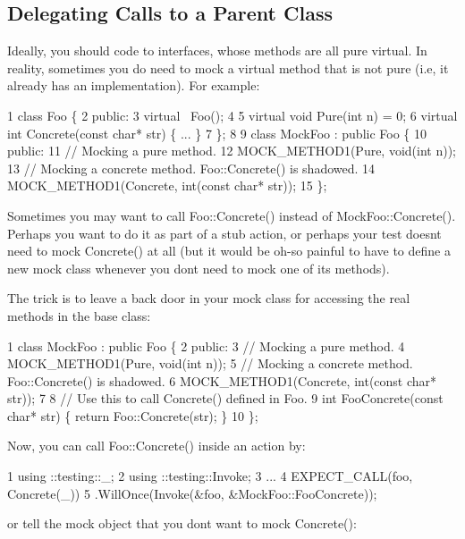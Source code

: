 \subsection*{Delegating Calls to a Parent Class}

Ideally, you should code to interfaces, whose methods are all pure virtual. In reality, sometimes you do need to mock a virtual method that is not pure (i.\+e, it already has an implementation). For example\+:


\begin{DoxyCode}
1 class Foo \{
2  public:
3   virtual ~Foo();
4 
5   virtual void Pure(int n) = 0;
6   virtual int Concrete(const char* str) \{ ... \}
7 \};
8 
9 class MockFoo : public Foo \{
10  public:
11   // Mocking a pure method.
12   MOCK\_METHOD1(Pure, void(int n));
13   // Mocking a concrete method.  Foo::Concrete() is shadowed.
14   MOCK\_METHOD1(Concrete, int(const char* str));
15 \};
\end{DoxyCode}


Sometimes you may want to call {\ttfamily Foo\+::\+Concrete()} instead of {\ttfamily Mock\+Foo\+::\+Concrete()}. Perhaps you want to do it as part of a stub action, or perhaps your test doesn\textquotesingle{}t need to mock {\ttfamily Concrete()} at all (but it would be oh-\/so painful to have to define a new mock class whenever you don\textquotesingle{}t need to mock one of its methods).

The trick is to leave a back door in your mock class for accessing the real methods in the base class\+:


\begin{DoxyCode}
1 class MockFoo : public Foo \{
2  public:
3   // Mocking a pure method.
4   MOCK\_METHOD1(Pure, void(int n));
5   // Mocking a concrete method.  Foo::Concrete() is shadowed.
6   MOCK\_METHOD1(Concrete, int(const char* str));
7 
8   // Use this to call Concrete() defined in Foo.
9   int FooConcrete(const char* str) \{ return Foo::Concrete(str); \}
10 \};
\end{DoxyCode}


Now, you can call {\ttfamily Foo\+::\+Concrete()} inside an action by\+:


\begin{DoxyCode}
1 using ::testing::\_;
2 using ::testing::Invoke;
3 ...
4   EXPECT\_CALL(foo, Concrete(\_))
5       .WillOnce(Invoke(&foo, &MockFoo::FooConcrete));
\end{DoxyCode}


or tell the mock object that you don\textquotesingle{}t want to mock {\ttfamily Concrete()}\+:


